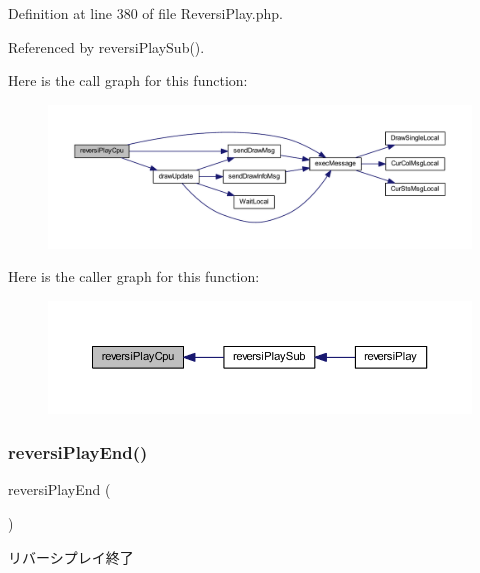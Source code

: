 Definition at line 380 of file Reversi\+Play.\+php.



Referenced by reversi\+Play\+Sub().

Here is the call graph for this function\+:\nopagebreak
\begin{figure}[H]
\begin{center}
\leavevmode
\includegraphics[width=350pt]{class_reversi_play_a6514ad9244af720ee1ec1777c11e80fb_cgraph}
\end{center}
\end{figure}
Here is the caller graph for this function\+:\nopagebreak
\begin{figure}[H]
\begin{center}
\leavevmode
\includegraphics[width=350pt]{class_reversi_play_a6514ad9244af720ee1ec1777c11e80fb_icgraph}
\end{center}
\end{figure}
\mbox{\label{class_reversi_play_af55fe6b6f2005c7da80c696ed692783d}} 
\subsubsection{\texorpdfstring{reversi\+Play\+End()}{reversiPlayEnd()}}
{\footnotesize\ttfamily reversi\+Play\+End (\begin{DoxyParamCaption}{ }\end{DoxyParamCaption})}



リバーシプレイ終了 

